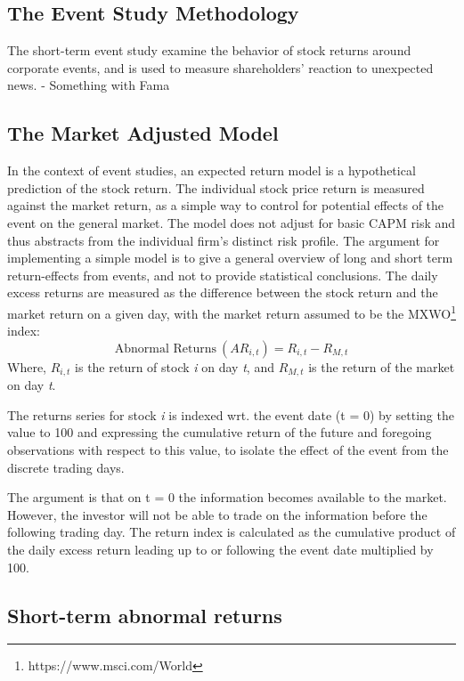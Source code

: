 \subsection{The Event Study Methodology}

The short-term event study examine the behavior of stock returns around corporate events, and is used to measure shareholders' reaction to unexpected news. 
- Something with Fama


\subsection{The Market Adjusted Model}

In the context of event studies, an expected return model is a hypothetical prediction of the stock return. The individual stock price return is measured against the market return, as a simple way to control for potential effects of the event on the general market. The model does not adjust for basic CAPM risk and thus abstracts from the individual firm's distinct risk profile. The argument for implementing a simple model is to give a general overview of long and short term return-effects from events, and not to provide statistical conclusions. 
The daily excess returns are measured as the difference between the stock return and the market return on a given day, with the market return assumed to be the MXWO\footnote{https://www.msci.com/World} index:
\begin{equation}
    \text{Abnormal Returns} \:  (AR_{i,t}) = R_{i,t} - R_{M,t} 
\end{equation}
Where, $R_{i,t}$ is the return of stock \textit{i} on day \textit{t}, and $R_{M,t}$ is the return of the market on day \textit{t}. 

The returns series for stock \textit{i} is indexed wrt. the event date (t = 0) by setting the value to 100 and expressing the cumulative return of the future and foregoing observations with respect to this value, to isolate the effect of the event from the discrete trading days. 

The argument is that on t = 0 the information becomes available to the market. However, the investor will not be able to trade on the information before the following trading day. The return index is calculated as the 
cumulative product of the daily excess return leading up to or following the event date multiplied by 100. 

\subsection{Short-term abnormal returns}

